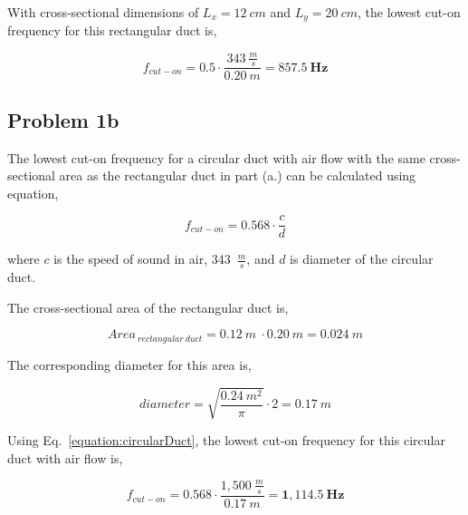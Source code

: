 \vspace{0.25cm}
With cross-sectional dimensions of $L_x = 12~cm$ and $L_y = 20~cm$, the lowest cut-on frequency for this rectangular duct is,

\vspace{-0.25cm}
\begin{equation*}
    f_{cut-on} = 0.5 \cdot \frac{ 343~\frac{m}{s} }{ 0.20~m } = \boldsymbol{857.5~Hz}
\end{equation*}



\vspace{-0.25cm}
\subsection*{Problem 1b}

The lowest cut-on frequency for a circular duct with air flow with the same cross-sectional area as the rectangular duct in part (a.) can be calculated using equation,

\vspace{-0.25cm}
\begin{equation}
    f_{cut-on} = 0.568 \cdot \frac{c}{d}
    \label{equation:circularDuct}
\end{equation}

where $c$ is the speed of sound in air, 343~$\frac{m}{s}$,  and $d$ is diameter of the circular duct.

\vspace{0.25cm}
The cross-sectional area of the rectangular duct is,

\vspace{-0.25cm}
\begin{equation*}
    Area_{~rectangular~duct} = 0.12~m~\cdot0.20~m =  0.024~m
\end{equation*}

\vspace{0.25cm}
The corresponding diameter for this area is,

\vspace{-0.25cm}
\begin{equation*}
    diameter = \sqrt{ \frac{0.24~m^2}{\pi} } \cdot 2 = 0.17~m
\end{equation*}

\vspace{0.25cm}
Using Eq.~\ref{equation:circularDuct}, the lowest cut-on frequency for this circular duct with air flow is,

\vspace{-0.25cm}
\begin{equation*}
    f_{cut-on} = 0.568 \cdot \frac{ 1,500~\frac{m}{s} }{ 0.17~m } = \boldsymbol{1,114.5~Hz}
\end{equation*}




